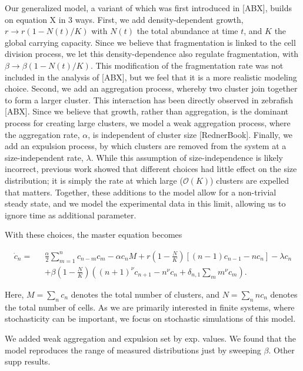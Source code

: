 \documentclass[aps,pre,twocolumn]{revtex4-1}
\begin{document}
Our generalized model, a variant of which was first introduced in [ABX], builds on equation X in 3 ways. First, we add density-dependent growth, $r\to r(1-N(t)/K)$ with $N(t)$ the total abundance at time $t$, and $K$ the global carrying capacity. Since we believe that fragmentation is linked to the cell division process, we let this density-dependence also regulate fragmentation, with $\beta\to \beta(1-N(t)/K)$. This modification of the fragmentation rate was not included in the analysis of [ABX], but we feel that it is a more realistic modeling choice. Second, we add an aggregation process, whereby two cluster join together to form a larger cluster. This interaction has been directly observed in zebrafish [ABX]. Since we believe that growth, rather than aggregation, is the dominant process for creating large clusters, we model a weak aggregation process, where the aggregation rate, $\alpha$, is independent of cluster size [RednerBook]. Finally, we add an expulsion process, by which clusters are removed from the system at a size-independent rate, $\lambda$. While this assumption of size-independence is likely incorrect, previous work showed that different choices had little effect on the size distribution; it is simply the rate at which large ($\mathcal{O}(K)$) clusters are expelled that matters. Together, these additions to the model allow for a non-trivial steady state, and we model the experimental data in this limit, allowing us to ignore time as additional parameter.




With these choices, the master equation becomes 

\begin{widetext}
	\begin{align*}
	\dot{c}_n = \text{ }& \frac{\alpha}{2}\sum_{m=1}^{n} c_{n-m}c_m - \alpha c_n M + r\left(1-\frac{N}{K}\right)\left[(n-1)c_{n-1} - nc_n\right]  - \lambda c_n \nonumber\\[6pt]
	&+\beta\left(1-\frac{N}{K}\right)\left((n+1)^{\nu}c_{n+1}- n^{\nu}c_n + \delta_{n,1}\sum_m m^{\nu}c_m\right). 
	\end{align*}
\end{widetext}

Here, $M = \sum_n c_n$ denotes the total number of clusters, and $N = \sum_n n c_n$ denotes the total number of cells. As we are primarily interested in finite systems, where stochasticity can be important, we focus on stochastic simulations of this model. 

We added weak aggregation and expulsion set by exp. values. We found that the model reproduces the range of measured distributions just by sweeping $\beta$. Other supp results.
\end{document}
